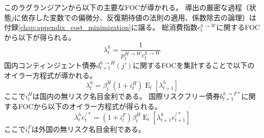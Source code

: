 このラグランジアンから以下の主要なFOCが導かれる。
導出の厳密な過程（状態\(j\)に依存した変数での偏微分、反復期待値の法則の適用、係数除去の論理）は
付録\ref{chap:appendix_cost_minimization}に譲る。
総消費指数\(c_t^{h\to W}\)に関するFOCから以下が得られる。
\begin{equation}
\label{form:model_households_indices_aggregation_stage2_home_lambda_h_p_H_W_c_h_W_eq}
    \lambda_t^h=\frac{1}{p_t^{H\to W}c_t^{h\to W}}
\end{equation}
国内コンティンジェント債券\(d_{t+1}^{h\to H}(j')\)に関するFOCを集計することで以下のオイラー方程式が導かれる。
\begin{equation}
\label{form:model_households_indices_aggregation_stage2_home_lambda_h_i_H_eq}
    \lambda_t^h=\beta_t^H(1+i_t^H)\operatorname{E}_t[\lambda_{t+1}^h]
\end{equation}
ここで\(i_t^H\)は国内の無リスク名目金利である。
国際リスクフリー債券\(b_{t+1}^{h\to F*}\)に関するFOCから以下のオイラー方程式が得られる。
\begin{equation}
\label{form:model_households_indices_aggregation_stage2_home_lambda_h_i_F_eq}
    \lambda_t^he_t^{/*}=(1+i_t^F)\beta_t^H\operatorname{E}_t\left[\lambda_{t+1}^he_{t+1}^{/*}\right]
\end{equation}
ここで\(i_t^F\)は外国の無リスク名目金利である。

